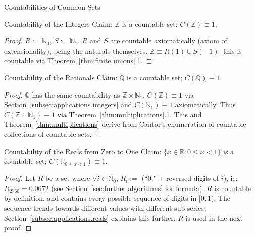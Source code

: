 \documentclass[12pt]{article}
\begin{document}
\begin{section}{Countabilities of Common Sets}\label{sec:applications}
	\begin{subsection}{Countability of the Integers}\label{subsec:applications.integers}
		Claim: $\mathbb Z$ is a countable set; $C(\mathbb Z)\equiv1$.
		\begin{proof}
			$R:=\mathbb N_0$, $S:=\mathbb N_1$. $R$ and $S$ are countable axiomatically
			(axiom of extensionality), being the naturals themselves. $\mathbb Z\equiv
			R(1)\cup S(-1)$; this is countable via Theorem~\ref{thm:finite unions}.1.
		\end{proof}
	\end{subsection}

	\begin{subsection}{Countability of the Rationals}\label{subsec:applications.rationals}
		Claim: $\mathbb Q$ is a countable set; $C(\mathbb Q)\equiv1$.
		\begin{proof}
			$\mathbb Q$ has the same countability as $\mathbb Z\times \mathbb N_1$.
			$C(\mathbb Z)\equiv1$ via Section~\ref{subsec:applications.integers} and
			$C(\mathbb N_1)\equiv1$ axiomatically. Thus $C(\mathbb Z\times \mathbb N_1)\equiv1$
			via Theorem~\ref{thm:multiplications}.1. This and Theorem~\ref{thm:multiplications} derive
			from Cantor's enumeration of countable collections of countable sets.
		\end{proof}
	\end{subsection}

	\begin{subsection}{Countability of the Reals from Zero to One}\label{subsec:applications.reals 0 to 1}
		Claim: $\{x\in\mathbb R:0\leqslant x<1\}$ is a countable set;
		$C(\mathbb R_{0\leqslant x<1})\equiv1$.
		\begin{proof}
			Let $R$ be a set where $\forall i\in\mathbb N_0$, $R_i := $ (``0." $+$ reversed digits
			of $i$), ie: $R_{2760}=0.0672$ (see Section~\ref{sec:further algorithms} for formula). $R$
			is countable by definition, and contains every possible sequence of digits in $[0,1)$. The
			sequence trends towards different values with different sub-series;
			Section~\ref{subsec:applications.reals} explains this further. $R$ is used in the next proof.
		\end{proof}
	\end{subsection}


\end{section}
\end{document}
